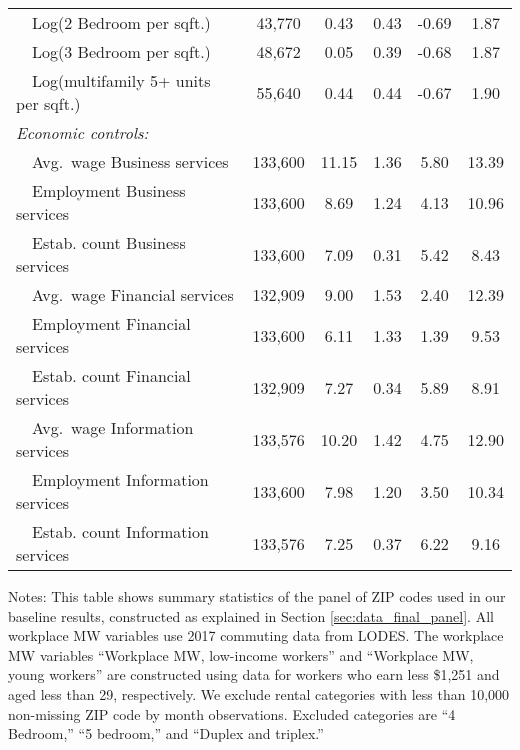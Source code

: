 \begin{table}[hbt!]
\begin{tabular}{@{}lccccc@{}}
        $\quad$Log(2 Bedroom per sqft.)               & 43,770  & 0.43  & 0.43  & -0.69  & 1.87  \\
        $\quad$Log(3 Bedroom per sqft.)               & 48,672  & 0.05  & 0.39  & -0.68  & 1.87  \\
        $\quad$Log(multifamily 5+ units per sqft.)    & 55,640  & 0.44  & 0.44  & -0.67  & 1.90  \\[.3em]
        \textit{Economic controls:}                   &       &       &       &       &       \\
        $\quad$Avg.\ wage Business services           & 133,600  & 11.15  & 1.36  & 5.80  & 13.39  \\
        $\quad$Employment Business services           & 133,600  & 8.69  & 1.24  & 4.13  & 10.96  \\
        $\quad$Estab. count Business services         & 133,600  & 7.09  & 0.31  & 5.42  & 8.43  \\
        $\quad$Avg.\ wage Financial services          & 132,909  & 9.00  & 1.53  & 2.40  & 12.39  \\
        $\quad$Employment Financial services          & 133,600  & 6.11  & 1.33  & 1.39  & 9.53  \\
        $\quad$Estab. count Financial services        & 132,909  & 7.27  & 0.34  & 5.89  & 8.91  \\
        $\quad$Avg.\ wage Information services        & 133,576  & 10.20  & 1.42  & 4.75  & 12.90  \\
        $\quad$Employment Information services        & 133,600  & 7.98  & 1.20  & 3.50  & 10.34  \\
        $\quad$Estab. count Information services      & 133,576  & 7.25  & 0.37  & 6.22  & 9.16  \\ \bottomrule
    \end{tabular}

    \begin{minipage}{.95\textwidth} \footnotesize
        \vspace{2mm}
        Notes: This table shows summary statistics of the panel of ZIP codes 
        used in our baseline results, constructed as explained in Section 
        \ref{sec:data_final_panel}.
        All workplace MW variables use 2017 commuting data from LODES.
        The workplace MW variables ``Workplace MW, low-income workers'' and 
        ``Workplace MW, young workers'' are constructed using data for 
        workers who earn less \$1,251 and aged less than 29, respectively.
        We exclude rental categories with less than 10,000 non-missing ZIP code 
        by month observations.
        Excluded categories are ``4 Bedroom,'' ``5 bedroom,'' and 
        ``Duplex and triplex.''
    \end{minipage}
\end{table}
